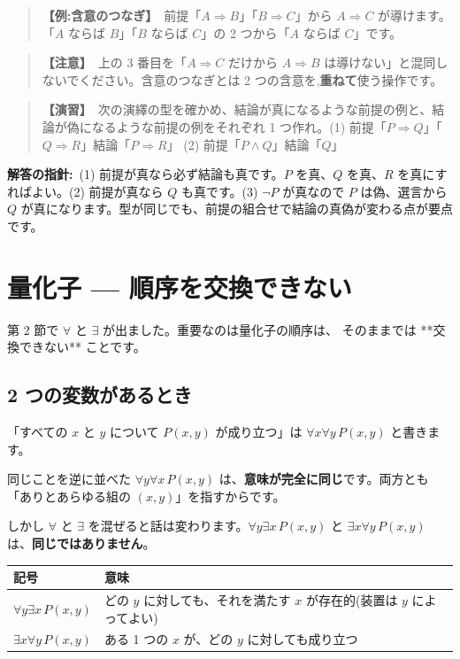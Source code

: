 \documentclass{article}
\begin{document}
\begin{quote}
\textbf{【例:含意のつなぎ】}\ 前提「\(A \Rightarrow B\)」「\(B \Rightarrow C\)」から \(A \Rightarrow C\) が導けます。「\(A\) ならば \(B\)」「\(B\) ならば \(C\)」の 2 つから「\(A\) ならば \(C\)」です。
\end{quote}

\begin{quote}
\textbf{【注意】}\ 上の 3 番目を「\(A \Rightarrow C\) だけから \(A \Rightarrow B\) は導けない」と混同しないでください。含意のつなぎとは 2 つの含意を,\textbf{重ねて}使う操作です。
\end{quote}

\begin{quote}
\textbf{【演習】}\ 次の演繹の型を確かめ、結論が真になるような前提の例と、結論が偽になるような前提の例をそれぞれ 1 つ作れ。(1) 前提「\(P \Rightarrow Q\)」「\(Q \Rightarrow R\)」結論「\(P \Rightarrow R\)」 (2) 前提「\(P \land Q\)」結論「\(Q\)」
\end{quote}

\textbf{解答の指針:}\ (1) 前提が真なら必ず結論も真です。\(P\) を真、\(Q\) を真、\(R\) を真にすればよい。(2) 前提が真なら \(Q\) も真です。(3) \(\neg P\) が真なので \(P\) は偽、選言から \(Q\) が真になります。型が同じでも、前提の組合せで結論の真偽が変わる点が要点です。

\section{量化子 — 順序を交換できない}

第 2 節で \(\forall\) と \(\exists\) が出ました。重要なのは量化子の順序は、
そのままでは **交換できない** ことです。

\subsection{2 つの変数があるとき}

「すべての \(x\) と \(y\) について \(P(x, y)\) が成り立つ」は \(\forall x \forall y \, P(x, y)\) と書きます。

同じことを逆に並べた \(\forall y \forall x \, P(x, y)\) は、\textbf{意味が完全に同じ}です。両方とも「ありとあらゆる組の \((x, y)\)」を指すからです。

しかし \(\forall\) と \(\exists\) を混ぜると話は変わります。\(\forall y \exists x \, P(x, y)\) と \(\exists x \forall y \, P(x, y)\) は、\textbf{同じではありません}。

\begin{center}
\begin{tabular}{|l|l|}
\hline
記号 & 意味 \\
\hline
\(\forall y \exists x \, P(x, y)\) & どの \(y\) に対しても、それを満たす \(x\) が存在的(装置は \(y\) によってよい) \\
\(\exists x \forall y \, P(x, y)\) & ある 1 つの \(x\) が、どの \(y\) に対しても成り立つ \\
\hline
\end{tabular}
\end{center}
\end{document}
